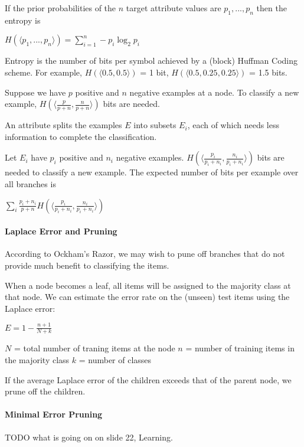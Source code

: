 If the prior probabilities of the $n$ target attribute values are $p_1,...,p_n$
then the entropy is

{\centering
    $H(\langle p_1,...,p_n\rangle) = \sum_{i=1}^{n} -p_i\log_2p_i$

}

Entropy is the number of bits per symbol achieved by a (block) Huffman Coding
scheme. For example, $H(\langle 0.5, 0.5 \rangle)$ = 1 bit, $H(\langle 0.5,
0.25, 0.25\rangle)$ = 1.5 bits.

Suppose we have $p$ positive and $n$ negative examples at a node. To classify a
new example, $H(\langle \frac{p}{p+n}, \frac{n}{p+n}\rangle)$ bits are needed.

An attribute splits the examples $E$ into subsets $E_i$, each of which needs
less information to complete the classification.

Let $E_i$ have $p_i$ positive and $n_i$ negative examples. $H(\langle
\frac{p_i}{p_i + n_i}, \frac{n_i}{p_i + n_i} \rangle)$ bits are needed to
classify a new example. The expected number of bits per example over all
branches is

{\centering
    $\sum_i \frac{p_i + n_i}{p + n} H(\langle \frac{p_i}{p_i + n_i},
    \frac{n_i}{p_i + n_i} \rangle)$

}

\paragraph{Laplace Error and Pruning}
According to Ockham's Razor, we may wish to pune off branches that do not
provide much benefit to classifying the items.

When a node becomes a leaf, all items will be assigned to the majority class at
that node. We can estimate the error rate on the (unseen) test items using the
Laplace error:

{\centering
    $E = 1 - \frac{n + 1}{N + k}$

}

$N$ = total number of traning items at the node
$n$ = number of training items in the majority class
$k$ = number of classes

If the average Laplace error of the children exceeds that of the parent node,
we prune off the children.

\paragraph{Minimal Error Pruning}
TODO what is going on on slide 22, Learning.

